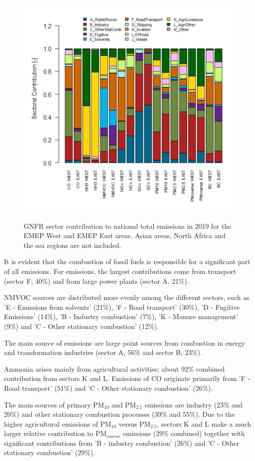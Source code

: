 \begin{figure}[h]
\centering
{\includegraphics*[viewport=1 1 565 565,clip,width=0.65\linewidth]{FIGS_CEIP/Fig7.pdf}}
\caption{GNFR sector contribution to national total emissions in 2019
  for the EMEP West and EMEP East areas. Asian areas, North Africa and the sea regions are not included.}
\label{fig:CEIP7}
\end{figure}

It is evident that the combustion of fossil fuels is responsible for a significant part of all emissions. For \nox emissions, the largest contributions come from transport (sector F, 40\%) and from large power plants (sector A, 21\%).

NMVOC sources are distributed more evenly among the different sectors,
such as 'E - Emissions from solvents' (21\%), 'F - Road transport' (30\%), 'D - Fugitive Emissions' (14\%), 'B - Industry combustion' (7\%), 'K - Manure management' (9\%) and 'C - Other stationary combustion' (12\%).


The main source of  \sox emissions are large point sources from combustion in energy and transformation industries (sector A, 56\% and sector B, 23\%).

Ammonia arises mainly from agricultural activities; about 92\% combined contribution from sectors K and L. Emissions of CO  originate primarily from 'F - Road transport' (51\%) and 'C - Other stationary combustion'  (26\%). 

The main sources of primary PM$_{10}$ and PM$_{2.5}$ emissions  are industry (23\% and 20\%) and other stationary combustion processes (39\% and 55\%). Due to the higher agricultural emissions of PM$_{10}$ versus PM$_{2.5}$, sectors K and L make a much larger relative contribution to PM$_{coarse}$ emissions (29\% combined) together with significant contributions from 'B - industry combustion' (26\%) and 'C - Other stationary combustion' (29\%). 

